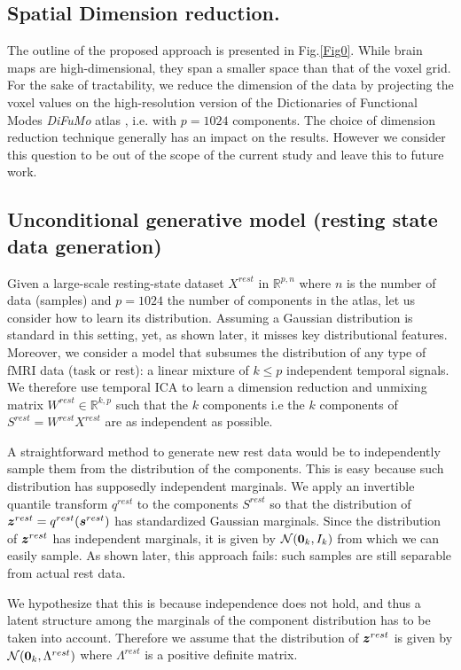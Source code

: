 \subsection{Spatial Dimension reduction.} 
The outline of the proposed approach is presented in Fig.\ref{Fig0}.
%
While brain maps are high-dimensional, they span a smaller space than that of
the voxel grid. 
%
For the sake of tractability, we reduce the dimension of the data by projecting the voxel values on the
high-resolution version of the Dictionaries of Functional Modes \emph{DiFuMo}
atlas \cite{dadi_fine-grain_2020}, i.e. with $p=1024$ components.
%
The choice of dimension reduction technique generally has an impact on the
results. However we consider this question to be out of the scope of the current study and leave this to future work.

\subsection{Unconditional generative model (resting state data generation)}
Given a large-scale resting-state dataset $X^{rest}$ in $\mathbb{R}^{p,n}$ where $n$ is the number of data (samples) and $p=1024$ the number of components in the atlas, let us consider how to learn its distribution.
%
Assuming a Gaussian distribution is standard in this setting, yet, as
shown later, it misses key distributional features.
%
Moreover, we consider a model that subsumes the distribution of any type of
fMRI data (task or rest): a linear mixture of $k \leq p$ independent temporal signals.
%
We therefore use temporal ICA to learn a dimension reduction and unmixing matrix
$W^{rest} \in \mathbb{R}^{k, p}$ such that the $k$ components i.e the $k$ components of
$S^{rest} = W^{rest} X^{rest}$ are as
independent as possible.
%
 
%

A straightforward method to generate new rest data would be to
independently sample them from the distribution of the components.
%
This is easy because such distribution has supposedly independent marginals.
We apply an invertible quantile transform $q^{rest}$ to the components $S^{rest}$ so that
the distribution of $\boldsymbol{z}^{rest} =
q^{rest}(\boldsymbol{s}^{rest})$ has standardized Gaussian marginals. Since the distribution of
$\boldsymbol{z}^{rest}$ has independent marginals, it is given by $\mathcal{N}({\boldsymbol{0}}_k, I_k)$
from which we can easily sample.
As shown later, this approach fails: such samples are still separable
from actual rest data.
%

We hypothesize that this is because independence does not hold, and
thus a latent structure among the marginals of the component distribution has to be taken into account. Therefore we assume that the distribution of $\boldsymbol{z}^{rest}$ is given
by $\mathcal{N}({\boldsymbol{0}}_k, \Lambda^{rest})$ where $\Lambda^{rest}$ is a positive definite matrix.

